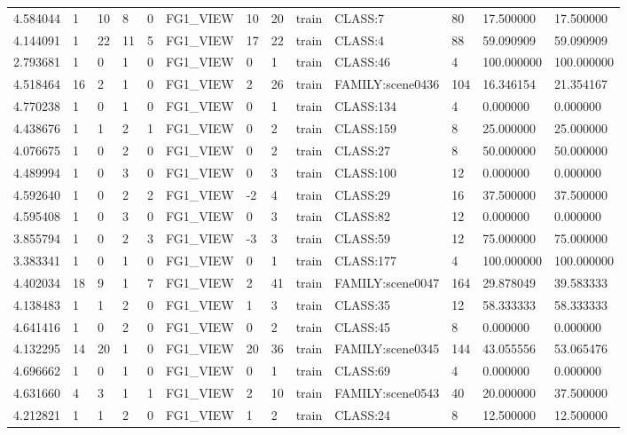 \begin{tabular}{lllllllllllll}
4.584044 & 1 & 10 & 8 & 0 & FG1\_VIEW & 10 & 20 & train & CLASS:7 & 80 & 17.500000 & 17.500000 \\
4.144091 & 1 & 22 & 11 & 5 & FG1\_VIEW & 17 & 22 & train & CLASS:4 & 88 & 59.090909 & 59.090909 \\
2.793681 & 1 & 0 & 1 & 0 & FG1\_VIEW & 0 & 1 & train & CLASS:46 & 4 & 100.000000 & 100.000000 \\
4.518464 & 16 & 2 & 1 & 0 & FG1\_VIEW & 2 & 26 & train & FAMILY:scene0436 & 104 & 16.346154 & 21.354167 \\
4.770238 & 1 & 0 & 1 & 0 & FG1\_VIEW & 0 & 1 & train & CLASS:134 & 4 & 0.000000 & 0.000000 \\
4.438676 & 1 & 1 & 2 & 1 & FG1\_VIEW & 0 & 2 & train & CLASS:159 & 8 & 25.000000 & 25.000000 \\
4.076675 & 1 & 0 & 2 & 0 & FG1\_VIEW & 0 & 2 & train & CLASS:27 & 8 & 50.000000 & 50.000000 \\
4.489994 & 1 & 0 & 3 & 0 & FG1\_VIEW & 0 & 3 & train & CLASS:100 & 12 & 0.000000 & 0.000000 \\
4.592640 & 1 & 0 & 2 & 2 & FG1\_VIEW & -2 & 4 & train & CLASS:29 & 16 & 37.500000 & 37.500000 \\
4.595408 & 1 & 0 & 3 & 0 & FG1\_VIEW & 0 & 3 & train & CLASS:82 & 12 & 0.000000 & 0.000000 \\
3.855794 & 1 & 0 & 2 & 3 & FG1\_VIEW & -3 & 3 & train & CLASS:59 & 12 & 75.000000 & 75.000000 \\
3.383341 & 1 & 0 & 1 & 0 & FG1\_VIEW & 0 & 1 & train & CLASS:177 & 4 & 100.000000 & 100.000000 \\
4.402034 & 18 & 9 & 1 & 7 & FG1\_VIEW & 2 & 41 & train & FAMILY:scene0047 & 164 & 29.878049 & 39.583333 \\
4.138483 & 1 & 1 & 2 & 0 & FG1\_VIEW & 1 & 3 & train & CLASS:35 & 12 & 58.333333 & 58.333333 \\
4.641416 & 1 & 0 & 2 & 0 & FG1\_VIEW & 0 & 2 & train & CLASS:45 & 8 & 0.000000 & 0.000000 \\
4.132295 & 14 & 20 & 1 & 0 & FG1\_VIEW & 20 & 36 & train & FAMILY:scene0345 & 144 & 43.055556 & 53.065476 \\
4.696662 & 1 & 0 & 1 & 0 & FG1\_VIEW & 0 & 1 & train & CLASS:69 & 4 & 0.000000 & 0.000000 \\
4.631660 & 4 & 3 & 1 & 1 & FG1\_VIEW & 2 & 10 & train & FAMILY:scene0543 & 40 & 20.000000 & 37.500000 \\
4.212821 & 1 & 1 & 2 & 0 & FG1\_VIEW & 1 & 2 & train & CLASS:24 & 8 & 12.500000 & 12.500000 \\

\end{tabular}
